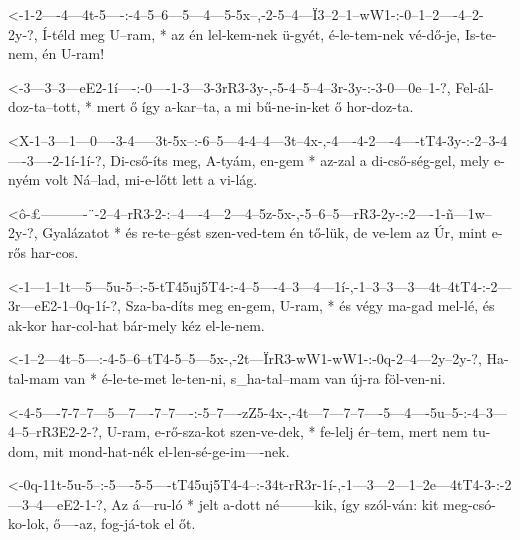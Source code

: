   {<-1-2----4---4t-5----:-4--5--6---5---4---5-5x--,-2-5--4---Ï3--2--1--wW1-:-0--1--2----4--2-2y-?,}
  {  Í-téld meg U--ram, * az én lel-kem-nek ü-gyét, é-le-tem-nek vé-dő-je,   Is-te-nem, én U-ram!}

  {<-3---3--3---eE2-1í----:-0----1-3---3-3rR3-3y-,-5-4--5--4--3r-3y-:-3-0---0e--1-?,}
  {  Fel-ál-doz-ta--tott, * mert ő így a-kar--ta,  a mi bű-ne-in-ket  ő hor-doz-ta.}

  {<X-1--3---1---0----3-4-----3t-5x--:-6--5---4-4--4---3t--4x-,-4----4-2----4----tT4-3y-:-2--3-4----3----2-1í-1í-?,}
  {   Di-cső-íts meg, A-tyám, en-gem * az-zal a di-cső-ség-gel, mely e-nyém volt Ná--lad, mi-e-lőtt lett a vi-lág.}


  {<ô-£----------¨-2--4--rR3-2-:--4----4---2---4--5z-5x-,-5--6--5---rR3-2y-:-2----1-ñ---1w--2y-?,}
  {   Gyalázatot * és re-te--gést szen-ved-tem én tő-lük, de ve-lem az  Úr,  mint e-rős har-cos.}

  {<-1---1--1t---5---5u-5--:-5-tT45uj5T4-:-4--5----4--3---4---1í-,-1--3--3---3---4t--4tT4-:-2---3r---eE2-1--0q-1í-?,}
  {  Sza-ba-díts meg en-gem, U-ram,      * és végy ma-gad mel-lé,  és ak-kor har-col-hat    bár-mely kéz el-le-nem.}

  {<-1--2---4t--5---:-4-5--6--tT4-5--5---5x-,-2t---ÏrR3-wW1-wW1-:-0q-2--4---2y--2y-?,}
  {  Ha-tal-mam van * é-le-te-met le-ten-ni,  s_ha-tal--mam van   új-ra föl-ven-ni.}



  {<-4-5----7-7--7---5---7----7--7----:-5--7----zZ5-4x-,-4t---7---7--7----5---4----5u--5-:-4--3---4--5--rR3E2-2-?,}
  {  U-ram, e-rő-sza-kot szen-ve-dek, * fe-lelj ér--tem, mert nem tu-dom, mit mond-hat-nék el-len-sé-ge-im----nek.}

  {<-0q-11t-5u-5--:-5----5-5----tT45uj5T4-4--:-34t-rR3r-1í-,-1---3---2---1--2e---4tT4-3-:-2---3--4---eE2-1-?,}
  {  Az á---ru-ló * jelt a-dott né--------kik, így szól-ván: kit meg-csó-ko-lok, ő----az, fog-já-tok el  őt.}

